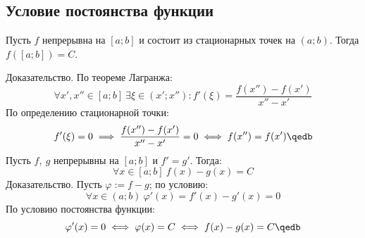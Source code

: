 \subsection{Условие постоянства функции}

Пусть $f$ непрерывна на $[a;b]$ и состоит из стационарных точек на $(a;b)$. Тогда 
$f([a;b])=C$.

{\bold Доказательство.} По теореме Лагранжа:
$$\forall x',x''\in[a;b]\ \exists\xi\in(x';x'')\colon f'(\xi)=\frac{f(x'')-f(x')}{x''-x'}
$$
По определению стационарной точки:
$$f'(\xi)=0\implies \frac{f(x'')-f(x')}{x''-x'}=0\iff f(x'')=f(x')\qedb$$
Пусть $f,\ g$ непрерывны на $[a;b]$ и $f'=g'$. Тогда:
$$\forall x\in[a;b]\ f(x)-g(x)=C$$
{\bold Доказательство.} Пусть $\varphi:=f-g$; по условию:
$$\forall x\in(a;b)\ \varphi'(x)=f'(x)-g'(x)=0$$
По условию постоянства функции:
$$\varphi'(x)=0\iff\varphi(x)=C\iff f(x)-g(x)=C\qedb$$
